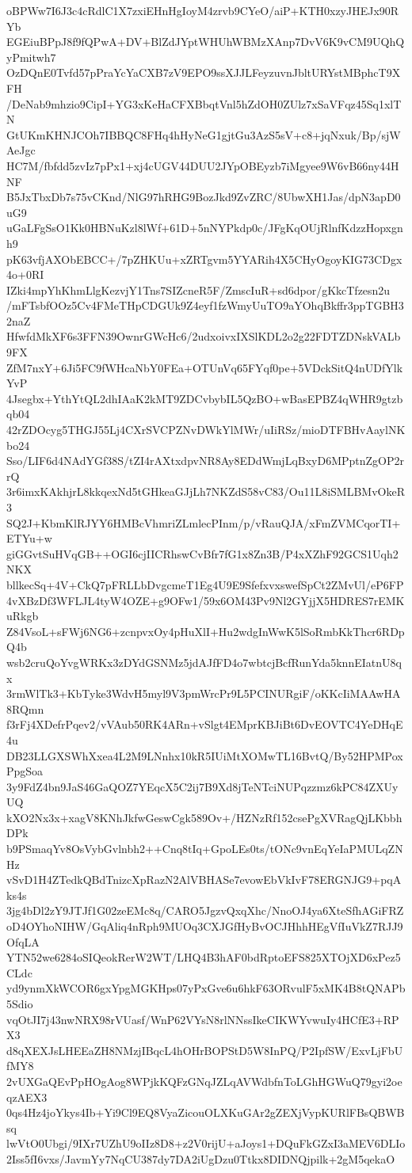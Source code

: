 oBPWw7I6J3c4cRdlC1X7zxiEHnHgIoyM4zrvb9CYeO/aiP+KTH0xzyJHEJx90RYb
EGEiuBPpJ8f9fQPwA+DV+BlZdJYptWHUhWBMzXAnp7DvV6K9vCM9UQhQyPmitwh7
OzDQnE0Tvfd57pPraYcYaCXB7zV9EPO9ssXJJLFeyzuvnJbltURYstMBphcT9XFH
/DeNab9mhzio9CipI+YG3xKeHaCFXBbqtVnl5hZdOH0ZUlz7xSaVFqz45Sq1xlTN
GtUKmKHNJCOh7IBBQC8FHq4hHyNeG1gjtGu3AzS5sV+c8+jqNxuk/Bp/sjWAeJgc
HC7M/fbfdd5zvIz7pPx1+xj4cUGV44DUU2JYpOBEyzb7iMgyee9W6vB66ny44HNF
B5JxTbxDb7s75vCKnd/NlG97hRHG9BozJkd9ZvZRC/8UbwXH1Jas/dpN3apD0uG9
uGaLFgSsO1Kk0HBNuKzl8lWf+61D+5nNYPkdp0c/JFgKqOUjRlnfKdzzHopxgnh9
pK63vfjAXObEBCC+/7pZHKUu+xZRTgvm5YYARih4X5CHyOgoyKIG73CDgx4o+0RI
IZki4mpYhKhmLlgKezvjY1Tns7SIZcneR5F/ZmscIuR+sd6dpor/gKkcTfzesn2u
/mFTsbfOOz5Cv4FMeTHpCDGUk9Z4eyf1fzWmyUuTO9aYOhqBkffr3ppTGBH32naZ
HfwfdMkXF6s3FFN39OwnrGWcHc6/2udxoivxIXSlKDL2o2g22FDTZDNskVALb9FX
ZfM7nxY+6Ji5FC9fWHcaNbY0FEa+OTUnVq65FYqf0pe+5VDckSitQ4nUDfYlkYvP
4Jsegbx+YthYtQL2dhIAaK2kMT9ZDCvbybIL5QzBO+wBasEPBZ4qWHR9gtzbqb04
42rZDOcyg5THGJ55Lj4CXrSVCPZNvDWkYlMWr/uIiRSz/mioDTFBHvAaylNKbo24
Sso/LIF6d4NAdYGf38S/tZI4rAXtxdpvNR8Ay8EDdWmjLqBxyD6MPptnZgOP2rrQ
3r6imxKAkhjrL8kkqexNd5tGHkeaGJjLh7NKZdS58vC83/Ou11L8iSMLBMvOkeR3
SQ2J+KbmKlRJYY6HMBcVhmriZLmlecPInm/p/vRauQJA/xFmZVMCqorTI+ETYu+w
giGGvtSuHVqGB++OGI6cjIICRhswCvBfr7fG1x8Zn3B/P4xXZhF92GCS1Uqh2NKX
bllkecSq+4V+CkQ7pFRLLbDvgcmeT1Eg4U9E9SfefxvxswefSpCt2ZMvUl/eP6FP
4vXBzDf3WFLJL4tyW4OZE+g9OFw1/59x6OM43Pv9Nl2GYjjX5HDRES7rEMKuRkgb
Z84VsoL+sFWj6NG6+zcnpvxOy4pHuXlI+Hu2wdgInWwK5lSoRmbKkThcr6RDpQ4b
wsb2cruQoYvgWRKx3zDYdGSNMz5jdAJfFD4o7wbtcjBcfRunYda5knnEIatnU8qx
3rmWlTk3+KbTyke3WdvH5myl9V3pmWrcPr9L5PCINURgiF/oKKcIiMAAwHA8RQmn
f3rFj4XDefrPqev2/vVAub50RK4ARn+vSlgt4EMprKBJiBt6DvEOVTC4YeDHqE4u
DB23LLGXSWhXxea4L2M9LNnhx10kR5IUiMtXOMwTL16BvtQ/By52HPMPoxPpgSoa
3y9FdZ4bn9JaS46GaQOZ7YEqcX5C2ij7B9Xd8jTeNTciNUPqzzmz6kPC84ZXUyUQ
kXO2Nx3x+xagV8KNhJkfwGeswCgk589Ov+/HZNzRf152csePgXVRagQjLKbbhDPk
b9PSmaqYv8OsVybGvlnbh2++Cnq8tIq+GpoLEs0ts/tONc9vnEqYeIaPMULqZNHz
vSvD1H4ZTedkQBdTnizcXpRazN2AlVBHASe7evowEbVkIvF78ERGNJG9+pqAks4s
3jg4bDl2zY9JTJf1G02zeEMc8q/CARO5JgzvQxqXhc/NnoOJ4ya6XteSfhAGiFRZ
oD4OYhoNIHW/GqAliq4nRph9MUOq3CXJGfHyBvOCJHhhHEgVfIuVkZ7RJJ9OfqLA
YTN52we6284oSIQeokRerW2WT/LHQ4B3hAF0bdRptoEFS825XTOjXD6xPez5CLdc
yd9ynmXkWCOR6gxYpgMGKHps07yPxGve6u6hkF63ORvulF5xMK4B8tQNAPb5Sdio
vqOtJI7j43nwNRX98rVUasf/WnP62VYsN8rlNNssIkeCIKWYvwuIy4HCfE3+RPX3
d8qXEXJsLHEEaZH8NMzjIBqcL4hOHrBOPStD5W8InPQ/P2IpfSW/ExvLjFbUfMY8
2vUXGaQEvPpHOgAog8WPjkKQFzGNqJZLqAVWdbfnToLGhHGWuQ79gyi2oeqzAEX3
0qs4Hz4joYkys4Ib+Yi9Cl9EQ8VyaZicouOLXKuGAr2gZEXjVypKURlFBsQBWBsq
lwVtO0Ubgi/9IXr7UZhU9oIIz8D8+z2V0rijU+aJoys1+DQuFkGZxI3aMEV6DLIo
2Iss5fI6vxs/JavmYy7NqCU387dy7DA2iUgDzu0Ttkx8DIDNQjpilk+2gM5qekaO
